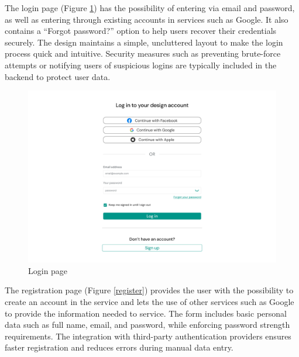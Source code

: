 \newpage
The login page (Figure \ref{login}) has the possibility of entering via email and password, as well as entering through existing accounts in services such as Google. 
It also contains a ``Forgot password?'' option to help users recover their credentials securely. 
The design maintains a simple, uncluttered layout to make the login process quick and intuitive. 
Security measures such as preventing brute-force attempts or notifying users of suspicious logins are typically included in the backend to protect user data.

\begin{figure}[H]
    \centering
    \includegraphics[width=18cm]{"images/figmaUI/login-crop.png"}
    \caption{Login page}
    \label{login}
\end{figure}

\newpage
The registration page (Figure \ref{register}) provides the user with the possibility to create an account in the service and lets the use of other services such as Google to provide the information needed to service. 
The form includes basic personal data such as full name, email, and password, while enforcing password strength requirements. 
The integration with third-party authentication providers ensures faster registration and reduces errors during manual data entry.

